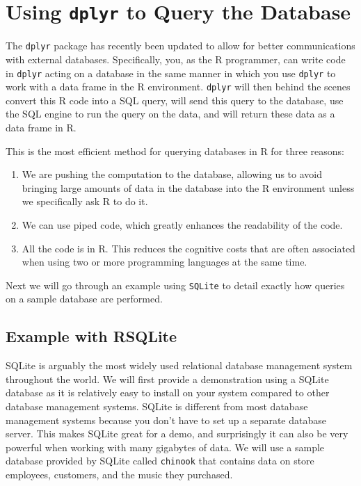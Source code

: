 \documentclass[]{krantz}
\providecommand{\tightlist}{%
  \setlength{\itemsep}{0pt}\setlength{\parskip}{0pt}}
\begin{document}
\section{\texorpdfstring{Using \texttt{dplyr} to Query the
Database}{Using dplyr to Query the Database}}\label{using-dplyr-to-query-the-database}

The \texttt{dplyr} package has recently been updated to allow for better
communications with external databases. Specifically, you, as the R
programmer, can write code in \texttt{dplyr} acting on a database in the
same manner in which you use \texttt{dplyr} to work with a data frame in
the R environment. \texttt{dplyr} will then behind the scenes convert
this R code into a SQL query, will send this query to the database, use
the SQL engine to run the query on the data, and will return these data
as a data frame in R.

This is the most efficient method for querying databases in R for three
reasons:

\begin{enumerate}
\def\labelenumi{\arabic{enumi}.}
\tightlist
\item
  We are pushing the computation to the database, allowing us to avoid
  bringing large amounts of data in the database into the R environment
  unless we specifically ask R to do it.
\item
  We can use piped code, which greatly enhances the readability of the
  code.
\item
  All the code is in R. This reduces the cognitive costs that are often
  associated when using two or more programming languages at the same
  time.
\end{enumerate}

Next we will go through an example using \texttt{SQLite} to detail
exactly how queries on a sample database are performed.

\subsection{Example with RSQLite}\label{example-with-rsqlite}

SQLite is arguably the most widely used relational database management
system throughout the world. We will first provide a demonstration using
a SQLite database as it is relatively easy to install on your system
compared to other database management systems. SQLite is different from
most database management systems because you don't have to set up a
separate database server. This makes SQLite great for a demo, and
surprisingly it can also be very powerful when working with many
gigabytes of data. We will use a sample database provided by SQLite
called \texttt{chinook} that contains data on store employees,
customers, and the music they purchased.
\end{document}
